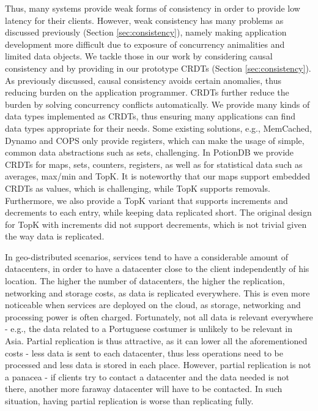 Thus, many systems provide weak forms of consistency in order to provide low latency for their clients.
However, weak consistency has many problems as discussed previously (Section \ref{sec:consistency}), namely making application development more difficult due to exposure of concurrency animalities and limited data objects.
We tackle those in our work by considering causal consistency \cite{???} and by providing in our prototype CRDTs \cite{???} (Section \ref{sec:consistency}).
As previously discussed, causal consistency avoids certain anomalies, thus reducing burden on the application programmer.
CRDTs further reduce the burden by solving concurrency conflicts automatically.
We provide many kinds of data types implemented as CRDTs, thus ensuring many applications can find data types appropriate for their needs.
Some existing solutions, e.g., MemCached, Dynamo and COPS \cite{???} only provide registers, which can make the usage of simple, common data abstractions such as sets, challenging.
In PotionDB we provide CRDTs for maps, sets, counters, registers, as well as for statistical data such as averages, max/min and TopK.
It is noteworthy that our maps support embedded CRDTs as values, which is challenging, while TopK supports removals.
Furthermore, we also provide a TopK variant that supports increments and decrements to each entry, while keeping data replicated short.
The original design for TopK with increments did not support decrements, which is not trivial given the way data is replicated.

In geo-distributed scenarios, services tend to have a considerable amount of datacenters, in order to have a datacenter close to the client independently of his location.
The higher the number of datacenters, the higher the replication, networking and storage costs, as data is replicated everywhere.
This is even more noticeable when services are deployed on the cloud, as storage, networking and processing power is often charged.
Fortunately, not all data is relevant everywhere - e.g., the data related to a Portuguese costumer is unlikely to be relevant in Asia.
Partial replication is thus attractive, as it can lower all the aforementioned costs - less data is sent to each datacenter, thus less operations need to be processed and less data is stored in each place.
However, partial replication is not a panacea - if clients try to contact a datacenter and the data needed is not there, another more faraway datacenter will have to be contacted.
In such situation, having partial replication is worse than replicating fully.

